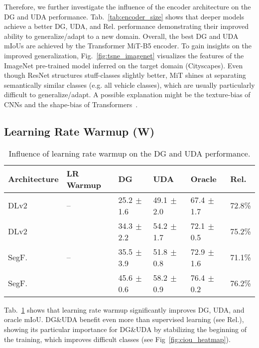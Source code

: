 \documentclass[journal,compsoc]{IEEEtran}
\newcommand*{\cm}{\checkmark}
\newcommand{\spm}[1]{\tiny{$\,\pm$#1}}
\begin{document}
Therefore, we further investigate the influence of the encoder architecture on the DG and UDA performance. Tab.~\ref{tab:encoder_size} shows that deeper models achieve a better DG, UDA, and Rel. performance demonstrating their improved ability to generalize/adapt to a new domain.
Overall, the best DG and UDA mIoUs are achieved by the Transformer MiT-B5 encoder. 
To gain insights on the improved generalization, Fig.~\ref{fig:tsne_imagenet} visualizes the features of the ImageNet pre-trained model inferred on the target domain (Cityscapes). Even though ResNet structures stuff-classes slightly better, MiT shines at separating semantically similar classes (e.g. all vehicle classes), which are usually particularly difficult to generalize/adapt. A possible explanation might be the texture-bias of CNNs and the shape-bias of Transformers~\cite{bhojanapalli2021understanding}.

\subsection{Learning Rate Warmup (W)}
\label{sec:exp_lr_warmup}

\begin{table}
\centering
\caption{Influence of learning rate warmup on the DG and UDA performance.}
\label{tab:warmup}
\setlength{\tabcolsep}{3pt}
\footnotesize
\begin{tabular}{llllll}
\toprule
Architecture & LR Warmup &           DG & UDA &         Oracle &   Rel. \\
\midrule
    DLv2~\cite{chen2017deeplab} &      -- & 25.2\spm{1.6} & 49.1\spm{2.0} & 67.4\spm{1.7} & 72.8\% \\
    DLv2~\cite{chen2017deeplab} &     \cm & 34.3\spm{2.2} & 54.2\spm{1.7} & 72.1\spm{0.5} & 75.2\% \\
    SegF.~\cite{xie2021segformer} &    -- & 35.5\spm{3.9} & 51.8\spm{0.8} & 72.9\spm{1.6} & 71.1\% \\
    SegF.~\cite{xie2021segformer} &   \cm & 45.6\spm{0.6} & 58.2\spm{0.9} & 76.4\spm{0.2} & 76.2\% \\
\bottomrule
\end{tabular}
\end{table} 
Tab.~\ref{tab:warmup} shows that learning rate warmup significantly improves DG, UDA, and oracle mIoU. 
DG\&UDA benefit even more than supervised learning (see Rel.), showing its particular importance for DG\&UDA by stabilizing the beginning of the training, which improves difficult classes (see Fig~\ref{fig:ciou_heatmap}).
\end{document}
